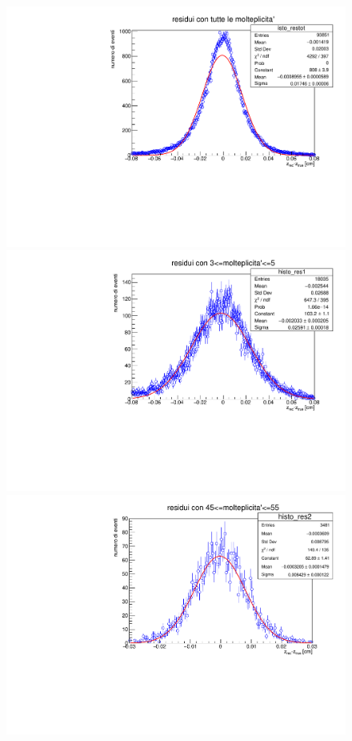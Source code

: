 \documentclass{article}
\begin{document}
\begin{figure}[!htb]
	\includegraphics[scale=0.28]{restot}
	
	\endminipage\hfill
	\includegraphics[scale=0.29]{resbassemult}
	
	\endminipage\hfill
	\includegraphics[scale=0.3]{resaltamult}
	
	\endminipage
\end{figure}
\end{document}
